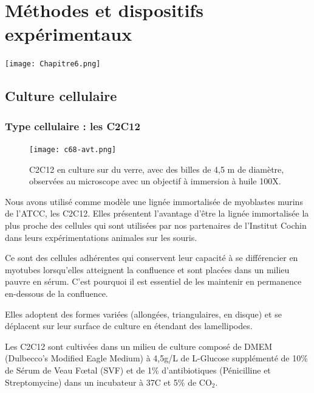 %



\chapter{Méthodes et dispositifs expérimentaux}

\begin{center}
\texttt{[image: Chapitre6.png]}
\end{center}

\newpage

\section{Culture cellulaire}
	\subsection{Type cellulaire : les C2C12}
	
	\begin{figure}
	\texttt{[image: c68-avt.png]}
	\caption{C2C12 en culture sur du verre, avec des billes de 4,5 \micro m de diamètre, observées au microscope avec un objectif à immersion à huile 100X.}
	\end{figure}
	
	Nous avons utilisé comme modèle une lignée immortalisée de myoblastes murins de l'ATCC, les C2C12. Elles présentent l'avantage d'être la lignée immortalisée la plus proche des cellules qui sont utilisées par nos partenaires de l'Institut Cochin dans leurs expérimentations animales sur les souris. 
	
	Ce sont des cellules adhérentes qui conservent leur capacité à se différencier en myotubes lorsqu'elles atteignent la confluence et sont placées dans un milieu pauvre en sérum. C'est pourquoi il est essentiel de les maintenir en permanence en-dessous de la confluence. 
	
	Elles adoptent des formes variées (allongées, triangulaires, en disque) et se déplacent sur leur surface de culture en étendant des lamellipodes. 
	
	Les C2C12 sont cultivées dans un milieu de culture composé de DMEM (Dulbecco's Modified Eagle Medium) à 4,5g/L de L-Glucose supplémenté de 10\% de Sérum de Veau F\oe tal (SVF) et de 1\% d'antibiotiques (Pénicilline et Streptomycine) dans un incubateur à 37\degres   C et 5\% de CO$_2$. 
	
